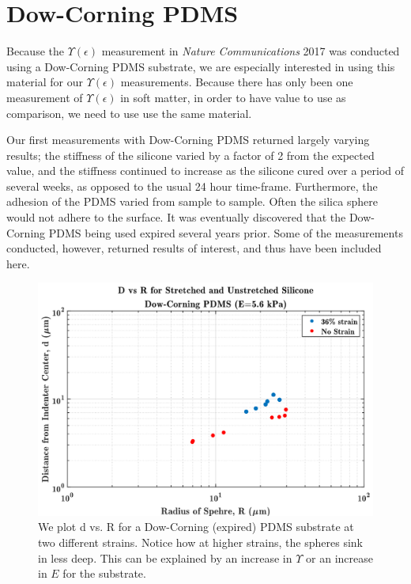 \section{Dow-Corning PDMS}
Because the $ \Upsilon(\epsilon) $ measurement in \textit{Nature Communications} 2017 \cite{xu2017direct} was conducted using a Dow-Corning PDMS substrate, we are especially interested in using this material for our $ \Upsilon(\epsilon) $ measurements. Because there has only been one measurement of $ \Upsilon(\epsilon) $ in soft matter, in order to have value to use as comparison, we need to use use the same material. 

Our first measurements with Dow-Corning PDMS returned largely varying results; the stiffness of the silicone varied by a factor of 2 from the expected value, and the stiffness continued to increase as the silicone cured over a period of several weeks, as opposed to the usual 24 hour time-frame. Furthermore, the adhesion of the PDMS varied from sample to sample. Often the silica sphere would not adhere to the surface. It was eventually discovered that the Dow-Corning PDMS being used expired several years prior. Some of the measurements conducted, however, returned results of interest, and thus have been included here.


\begin{figure}[h]
	\centering
	\includegraphics[width=\linewidth]{Chapters/Figures/d_vs_r_stretch_vs_no_stretch_DC181115}
	\caption[D vs. R Dow-Corning]{We plot d vs. R for a Dow-Corning (expired) PDMS substrate at two different strains. Notice how at higher strains, the spheres sink in less deep. This can be explained by an increase in $\Upsilon$ or an increase in $E$ for the substrate.}
	\label{fig:dvsrstretchvsnostretchdc181115}
\end{figure}

